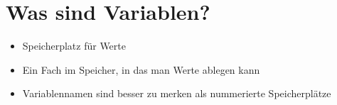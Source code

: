 



\subtitle{Kabitel 3: Daten Zwischenspeichern}
\maketitle

\section{Was sind Variablen?}
\begin{frame}[fragile]
	\slidehead
	\begin{itemize}
		\item Speicherplatz für Werte
		\pause
		\item Ein Fach im Speicher, in das man Werte ablegen kann
		\pause
		\item Variablennamen sind besser zu merken als nummerierte Speicherplätze
	\end{itemize}
\end{frame}

